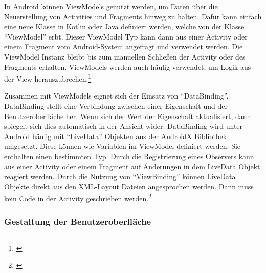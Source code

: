 

In Android können ViewModels genutzt werden, um Daten über die Neuerstellung von Activities und Fragments hinweg zu halten. Dafür kann einfach eine neue Klasse in Kotlin oder Java definiert werden, welche von der Klasse \enquote{ViewModel} erbt. Dieser ViewModel Typ kann dann aus einer Activity oder einem Fragment vom Android-System angefragt und verwendet werden. Die ViewModel Instanz bleibt bis zum manuellen Schließen der Activity oder des Fragments erhalten. ViewModels werden auch häufig verwendet, um Logik aus der View herauszubrechen.\footnote{\cite[Vgl.][210\psqq]{Hagos2020}}

Zusammen mit ViewModels eignet sich der Einsatz von \enquote{DataBinding}. DataBinding stellt eine Verbindung zwischen einer Eigenschaft und der Benutzeroberfläche her. Wenn sich der Wert der Eigenschaft aktualisiert, dann spiegelt sich dies automatisch in der Ansicht wider. DataBinding wird unter Android häufig mit \enquote{LiveData} Objekten aus der AndroidX Bibliothek umgesetzt. Diese können wie Variablen im ViewModel definiert werden. Sie enthalten einen bestimmten Typ. Durch die Registrierung eines Observers kann aus einer Activity oder einem Fragment auf Änderungen in dem LiveData Objekt reagiert werden. Durch die Nutzung von \enquote{ViewBinding} können LiveData Objekte direkt aus den XML-Layout Dateien angesprochen werden. Dann muss kein Code in der Activity geschrieben werden.\footnote{\cite[Vgl.][214\psqq]{Hagos2020}}

\subsubsection{Gestaltung der Benutzeroberfläche}
\label{sec:material_design}

